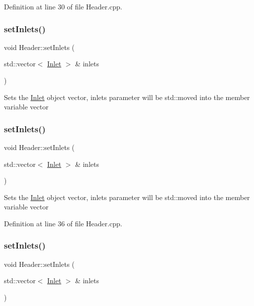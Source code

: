 Definition at line 30 of file Header.\+cpp.

\mbox{\label{class_header_ae69b6f894210a6cd340e92222f8bc343}} 
\subsubsection{\texorpdfstring{set\+Inlets()}{setInlets()}\hspace{0.1cm}{\footnotesize\ttfamily [1/3]}}
{\footnotesize\ttfamily void Header\+::set\+Inlets (\begin{DoxyParamCaption}\item[{std\+::vector$<$ \hyperlink{class_inlet}{Inlet} $>$ \&}]{inlets }\end{DoxyParamCaption})}

Sets the \hyperlink{class_inlet}{Inlet} object vector, inlets parameter will be std\+::moved into the member variable vector \mbox{\label{class_header_ae69b6f894210a6cd340e92222f8bc343}} 
\subsubsection{\texorpdfstring{set\+Inlets()}{setInlets()}\hspace{0.1cm}{\footnotesize\ttfamily [2/3]}}
{\footnotesize\ttfamily void Header\+::set\+Inlets (\begin{DoxyParamCaption}\item[{std\+::vector$<$ \hyperlink{class_inlet}{Inlet} $>$ \&}]{inlets }\end{DoxyParamCaption})}

Sets the \hyperlink{class_inlet}{Inlet} object vector, inlets parameter will be std\+::moved into the member variable vector 

Definition at line 36 of file Header.\+cpp.

\mbox{\label{class_header_ae69b6f894210a6cd340e92222f8bc343}} 
\subsubsection{\texorpdfstring{set\+Inlets()}{setInlets()}\hspace{0.1cm}{\footnotesize\ttfamily [3/3]}}
{\footnotesize\ttfamily void Header\+::set\+Inlets (\begin{DoxyParamCaption}\item[{std\+::vector$<$ \hyperlink{class_inlet}{Inlet} $>$ \&}]{inlets }\end{DoxyParamCaption})}

